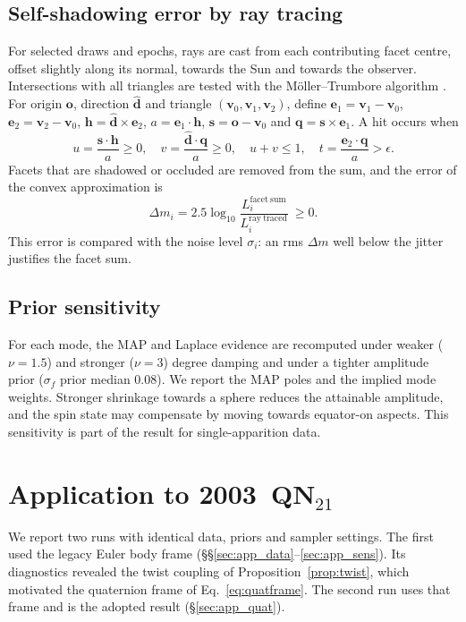 \documentclass[11pt,a4paper]{article}
\theoremstyle{remark}
\newcommand{\vect}[1]{\bm{#1}}
\newcommand{\uv}[1]{\hat{\bm{#1}}}
\begin{document}
\subsection{Self-shadowing error by ray tracing}
\label{sec:shadow}
For selected draws and epochs, rays are cast from each contributing facet centre, offset slightly along
its normal, towards the Sun and towards the observer. Intersections with all triangles are tested with
the M\"oller--Trumbore algorithm \citep{moller1997}. For origin $\vect o$, direction $\uv d$ and
triangle $(\vect v_0,\vect v_1,\vect v_2)$, define $\vect e_1=\vect v_1-\vect v_0$,
$\vect e_2=\vect v_2-\vect v_0$, $\vect h=\uv d\times\vect e_2$, $a=\vect e_1\cdot\vect h$,
$\vect s=\vect o-\vect v_0$ and $\vect q=\vect s\times\vect e_1$. A hit occurs when
\begin{equation}
  u=\frac{\vect s\cdot\vect h}{a}\ge0,\quad v=\frac{\uv d\cdot\vect q}{a}\ge0,\quad u+v\le1,\quad
  t=\frac{\vect e_2\cdot\vect q}{a}>\epsilon .
\end{equation}
Facets that are shadowed or occluded are removed from the sum, and the error of the convex
approximation is
\begin{equation}
  \Delta m_i=2.5\log_{10}\frac{L_i^{\mathrm{facet\ sum}}}{L_i^{\mathrm{ray\ traced}}}\ \ge0 .
\end{equation}
This error is compared with the noise level $\sigma_i$: an rms $\Delta m$ well below the jitter
justifies the facet sum.

\subsection{Prior sensitivity}
\label{sec:sensitivity}
For each mode, the MAP and Laplace evidence are recomputed under weaker ($\nu=1.5$) and stronger ($\nu=3$)
degree damping and under a tighter amplitude prior ($\sigma_f$ prior median $0.08$). We report the MAP
poles and the implied mode weights. Stronger shrinkage towards a sphere reduces the attainable
amplitude, and the spin state may compensate by moving towards equator-on aspects. This sensitivity is
part of the result for single-apparition data.

\section{Application to 2003~QN$_{21}$}
\label{sec:application}

We report two runs with identical data, priors and sampler settings. The first used the legacy Euler body
frame (\S\S\ref{sec:app_data}--\ref{sec:app_sens}). Its diagnostics revealed the twist coupling of
Proposition~\ref{prop:twist}, which motivated the quaternion frame of Eq.~\eqref{eq:quatframe}. The second
run uses that frame and is the adopted result (\S\ref{sec:app_quat}).
\end{document}
